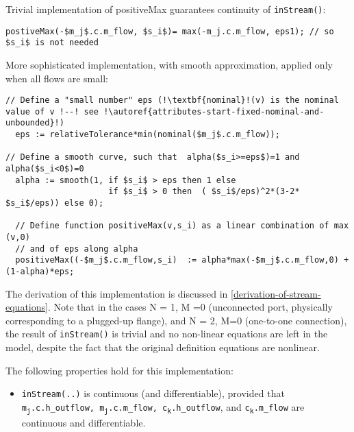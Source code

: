 \begin{nonnormative}
Trivial implementation of positiveMax guarantees continuity of \lstinline!inStream()!:
\begin{lstlisting}[language=modelica,mathescape=true]
postiveMax(-$m_j$.c.m_flow, $s_i$)= max(-m_j.c.m_flow, eps1); // so $s_i$ is not needed
\end{lstlisting}
More sophisticated implementation, with smooth approximation, applied only when {all} flows are small:
\begin{lstlisting}[language=modelica,escapechar=!,mathescape=true]
// Define a "small number" eps (!\textbf{nominal}!(v) is the nominal value of v !--! see !\autoref{attributes-start-fixed-nominal-and-unbounded}!)
  eps := relativeTolerance*min(nominal($m_j$.c.m_flow));

// Define a smooth curve, such that  alpha($s_i>=eps$)=1 and alpha($s_i<0$)=0
  alpha := smooth(1, if $s_i$ > eps then 1 else
                     if $s_i$ > 0 then  ( $s_i$/eps)^2*(3-2* $s_i$/eps)) else 0);

  // Define function positiveMax(v,s_i) as a linear combination of max (v,0)
  // and of eps along alpha
  positiveMax((-$m_j$.c.m_flow,s_i)  := alpha*max(-$m_j$.c.m_flow,0) +  (1-alpha)*eps;
\end{lstlisting}

The derivation of this implementation is discussed in
\autoref{derivation-of-stream-equations}. Note that in the cases N = 1, M =0 (unconnected port,
physically corresponding to a plugged-up flange), and N = 2, M=0
(one-to-one connection), the result of \lstinline!inStream()! is trivial
and no non-linear equations are left in the model, despite the fact that
the original definition equations are nonlinear.

The following properties hold for this implementation:
\begin{itemize}
\item
  \lstinline!inStream(..)! is continuous (and differentiable),
  provided that \texttt{m\textsubscript{j}.c.h\_outflow,
  m\textsubscript{j}.c.m\_flow,
  c\textsubscript{k}.h\_outflow}, and
  \texttt{c\textsubscript{k}.m\_flow} are continuous and differentiable.
\end{itemize}


\end{nonnormative}
